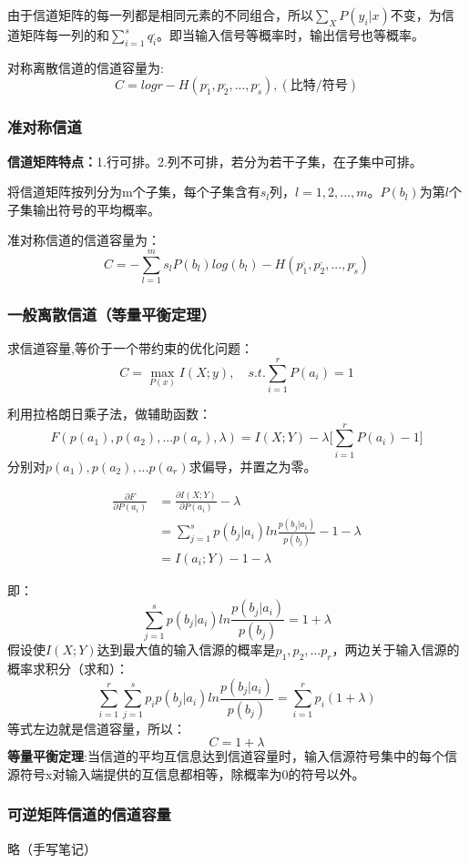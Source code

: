 \documentclass[UTF8]{ctexart} %
\begin{document}
			由于信道矩阵的每一列都是相同元素的不同组合，所以$\sum_{X}P(y_i|x)$不变，为信道矩阵每一列的和$\sum_{i=1}^sq_i^,$。即当输入信号等概率时，输出信号也等概率。
			
			对称离散信道的信道容量为:
			\[C =  logr -  H(p_1^,,p_2^,,...,p_s^,),(\text{比特/符号})\]
		\subsubsection{准对称信道}
			\textbf{信道矩阵特点：}1.行可排。2.列不可排，若分为若干子集，在子集中可排。
			
			将信道矩阵按列分为m个子集，每个子集含有$s_l$列，$l=1,2,...,m$。$P(b_l)$为第$l$个子集输出符号的平均概率。
			
			准对称信道的信道容量为：
			\[C = -\sum_{l=1}^ms_lP(b_l)log(b_l) -H(p_1^,,p_2^,,...,p_s^,) \]
			
		\subsubsection{一般离散信道（等量平衡定理）}
			求信道容量,等价于一个带约束的优化问题：
			\[C = \max_{P(x)}I(X;y),\quad s.t.\sum_{i=1}^rP(a_i)=1\]
			
			利用拉格朗日乘子法，做辅助函数：
			\[F(p(a_1),p(a_2),...p(a_r),\lambda) = I(X;Y)- \lambda\bigg[\sum_{i=1}^rP(a_i)-1\bigg]\]
			分别对$p(a_1),p(a_2),...p(a_r)$求偏导，并置之为零。
			
			\[\begin{aligned}
			\frac{\partial F}{\partial P(a_i)} &= \frac{\partial I(X;Y)}{\partial P(a_i)}-\lambda\\
			&=\sum_{j=1}^sp(b_j|a_i)ln\frac{p(b_j|a_i)}{p(b_j)}-1-\lambda\\
			&=I(a_i;Y)-1-\lambda
			\end{aligned}\]
			
			即：
			\[\sum_{j=1}^sp(b_j|a_i)ln\frac{p(b_j|a_i)}{p(b_j)}= 1+\lambda\]
			假设使$I(X;Y)$达到最大值的输入信源的概率是${p_1,p_2,...p_r}$，两边关于输入信源的概率求积分（求和）：
			\[\sum_{i=1}^r\sum_{j=1}^sp_ip(b_j|a_i)ln\frac{p(b_j|a_i)}{p(b_j)}= \sum_{i=1}^rp_i(1+\lambda)\]
			等式左边就是信道容量，所以：
			\[C = 1+\lambda\]
			\textbf{等量平衡定理}:当信道的平均互信息达到信道容量时，输入信源符号集中的每个信源符号x对输入端提供的互信息都相等，除概率为0的符号以外。
			
		\subsubsection{可逆矩阵信道的信道容量}
			略（手写笔记）
\end{document}
